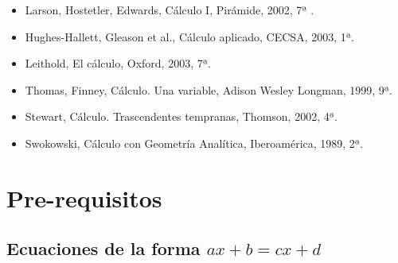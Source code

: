 \documentclass[12pt]{article}
\begin{document}
\begin{itemize}
\item
  Larson, Hostetler, Edwards, Cálculo I, Pirámide, 2002, 7ª .
\item
  Hughes-Hallett, Gleason et al., Cálculo aplicado, CECSA, 2003, 1ª.\\
\item
  Leithold, El cálculo, Oxford, 2003, 7ª.
\item
  Thomas, Finney, Cálculo. Una variable, Adison Wesley Longman, 1999,
  9ª.
\item
  Stewart, Cálculo. Trascendentes tempranas, Thomson, 2002, 4ª.
\item
  Swokowski, Cálculo con Geometría Analítica, Iberoamérica, 1989, 2ª.
\end{itemize}

\section{Pre-requisitos}\label{pre-requisitos}

\subsection{\texorpdfstring{Ecuaciones de la forma
\(ax+b=cx+d\)}{Ecuaciones de la forma ax+b=cx+d}}\label{ecuaciones-de-la-forma-axbcxd}
\end{document}

